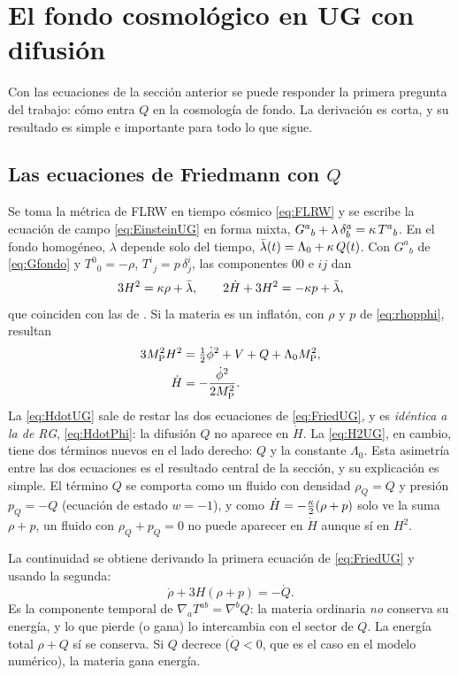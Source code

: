 \section{El fondo cosmológico en UG con difusión}
\label{sec:fondo}

Con las ecuaciones de la sección anterior se puede responder la primera pregunta del trabajo: cómo entra $Q$ en la cosmología de fondo. La derivación es corta, y su resultado es simple e importante para todo lo que sigue.

\subsection{Las ecuaciones de Friedmann con $Q$}

Se toma la métrica de FLRW en tiempo cósmico \eqref{eq:FLRW} y se escribe la ecuación de campo \eqref{eq:EinsteinUG} en forma mixta, $G^a{}_b+\lambda\,\delta^a_b=\kappa\,T^a{}_b$. En el fondo homogéneo, $\lambda$ depende solo del tiempo, $\bar\lambda(t)=\Lambda_0+\kappa\,Q(t)$. Con $G^a{}_b$ de \eqref{eq:Gfondo} y $T^0{}_0=-\rho$, $T^i{}_j=p\,\delta^i_j$, las componentes $00$ e $ij$ dan 
\begin{equation}
3H^2=\kappa\rho+\bar\lambda,\qquad 2\dot H+3H^2=-\kappa p+\bar\lambda,
\label{eq:FriedUG}
\end{equation}
que coinciden con las de \cite{leon22}. Si la materia es un inflatón, con $\rho$ y $p$ de \eqref{eq:rhopphi}, resultan
\begin{align}
3M_{\rm P}^2H^2&=\tfrac12\dot\phi^2+V+Q+\Lambda_0M_{\rm P}^2, \label{eq:H2UG}\\
\dot H&=-\frac{\dot\phi^2}{2M_{\rm P}^2}. \label{eq:HdotUG}
\end{align}
La \eqref{eq:HdotUG} sale de restar las dos ecuaciones de \eqref{eq:FriedUG}, y es \emph{idéntica a la de RG}, \eqref{eq:HdotPhi}: la difusión $Q$ no aparece en $\dot H$. La \eqref{eq:H2UG}, en cambio, tiene dos términos nuevos en el lado derecho: $Q$ y la constante $\Lambda_0$. Esta asimetría entre las dos ecuaciones es el resultado central de la sección, y su explicación es simple. El término $Q$ se comporta como un fluido con densidad $\rho_Q=Q$ y presión $p_Q=-Q$ (ecuación de estado $w=-1$), y como $\dot H=-\tfrac{\kappa}{2}(\rho+p)$ solo ve la suma $\rho+p$, un fluido con $\rho_Q+p_Q=0$ no puede aparecer en $\dot H$ aunque sí en $H^2$.

La continuidad se obtiene derivando la primera ecuación de \eqref{eq:FriedUG} y usando la segunda:
\begin{equation}
\dot\rho+3H(\rho+p)=-\dot Q.
\label{eq:contUG}
\end{equation}
Es la componente temporal de $\nabla_aT^{ab}=\nabla^bQ$: la materia ordinaria \emph{no} conserva su energía, y lo que pierde (o gana) lo intercambia con el sector de $Q$. La energía total $\rho+Q$ sí se conserva. Si $Q$ decrece ($\dot Q<0$, que es el caso en el modelo numérico), la materia gana energía.

